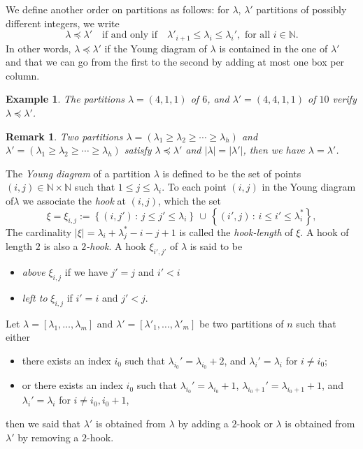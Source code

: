 \documentclass[12pt]{amsart}
\numberwithin{equation}{subsection}
\newtheorem{remark}[equation]{Remark}
\newtheorem{example}[equation]{Example}
\newcommand{\NN}{\mathbb{N}}
\begin{document}
We  define another order on partitions as follows: for $\lambda$, $\lambda'$ partitions of possibly different integers, we write
\begin{equation}\lambda\preceq\lambda'\quad\text{if and only if}\quad \lambda'_{i+1}\le\lambda_i\le\lambda_i' ,\text{ for all $i\in\NN$.}
\end{equation}
In other words, $\lambda\preceq\lambda'$ if the Young diagram of $\lambda$ is contained in the one of $\lambda'$ and that we can go from the first to the second by adding at most one box per column. 

\begin{example} {\rm 
The partitions $\lambda= (4,1,1)$ of $6$, and $\lambda'= (4,4,1,1)$ of $10$ verify $\lambda\preceq\lambda'$. }
\end{example}

\begin{remark} {\rm Two partitions $\lambda=(\lambda_1\ge\lambda_2\ge\cdots\ge\lambda_h)$  and $\lambda'=(\lambda_1\ge\lambda_2\ge\cdots\ge\lambda_{h})$  satisfy $\lambda\preceq\lambda'$ and $|\lambda|=|\lambda'|$, then we have $\lambda=\lambda'$. }
\end{remark}

The \textit{Young diagram} of  a partition  $\lambda$ is defined to be the set of points $(i, j) \in\NN \times\NN$ such that $1 \le j \le \lambda_i$.
To each point $(i, j)$ in the Young diagram of$\lambda$ we associate the \textit{hook} at $(i,j)$, which the set
\begin{equation}
\xi=\xi_{i,j} :=\left\{(i,j')\,:\, j\le j'\le  \lambda_i\right\}\,\cup\,\left\{(i',j)\,:\,i\le i'\le \lambda^\ast_i \right\},
\end{equation}  
The cardinality 
$|\xi|=\lambda_i +\lambda_j^\ast -i-j+1$
is called the \textit{hook-length} of $\xi$. A hook of length $2$ is also  a \textit{$2$-hook}. A hook 
$\xi_{i',j'}$ of $\lambda$ is said to be 
\begin{itemize}
\item \textit{above} $\xi_{i,j}$ if we have $j'=j$ and $i'<i$
\item \textit{left to}  $\xi_{i,j}$  if $i'=i$ and $j'<j$.
\end{itemize}
Let  $\lambda=[\lambda_1,\ldots,\lambda_m]$ and $\lambda'=[\lambda'_1,\ldots,\lambda'_m]$ be
two partitions of $n$ such that either
\begin{itemize}
\item there exists an index $i_0$ such that $\lambda_{i_0}'=\lambda_{i_0}+2$, and $\lambda_i'=\lambda_i$ for $i\ne i_0$;
\item
or  there exists an index $i_0$ such that $\lambda_{i_0}'=\lambda_{i_0}+1$,  $\lambda_{i_0+1}'=\lambda_{i_0+1}+1$, and
$\lambda_i'=\lambda_i$ for $i\ne i_0,i_0+1 $,
\end{itemize}
then we said that $\lambda'$ is obtained from $\lambda$ by adding a $2$-hook or $\lambda$ is obtained from $\lambda'$ by removing a $2$-hook.
\end{document}
